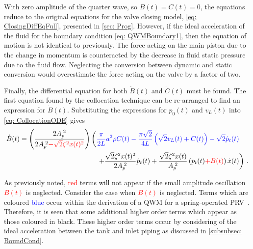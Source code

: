 With zero amplitude of the quarter wave, so $B(t) = C(t) = 0$, the equations reduce to the original equations for the valve closing model, \cref{eq: ClosingDiffEqFull}, presented in \cref{sec: Prog}. However, if the ideal acceleration of the fluid for the boundary condition \cref{eq: QWMBoundary1}, then the equation of motion is not identical to previously. The force acting on the main piston due to the change in momentum is counteracted by the decrease in fluid static pressure due to the fluid flow. Neglecting the conversion between dynamic and static conversion would overestimate the force acting on the valve by a factor of two.
%

Finally, the differential equation for both $\dot{B}(t)$ and $\dot{C}(t)$ must be found. The first equation found by the collocation technique can be re-arranged to find an expression for $\dot{B}(t)$. Substituting the expressions for $p_0(t)$ and $v_L(t)$ into \cref{eq: CollocationODE} gives
~
\begin{equation}  \label{eq: QWMFullDiffB}
\begin{split}
    \dot{B}(t) = \left( \frac{2 A_p\power{2}}{2 A_p\power{2} \textcolor{Red}{- \sqrt{2} \zeta^2 x(t)^2}} \right)
    &\left( \textcolor{Blue}{
    \frac{\pi}{2L} a^2 \rho C(t) - \frac{\pi \sqrt{2}}{4L} \left( \sqrt{2} v_L(t) + C(t) \right) - \sqrt{2} \dot{p}_t(t)}
     \right.  \\ & \quad \left.  %
    + \frac{\sqrt{2} \zeta^2 x(t)^2}{2 A_p\power{2}} \dot{p}_t(t) + \frac{\sqrt{2} \zeta^2 x(t)}{A_p\power{2}} \left( p_t(t) \textcolor{Red}{+ B(t)} \right) \dot{x}(t)
    \right) \, .
\end{split}
\end{equation}

As previously noted, \textcolor{Red}{red} terms will not appear if the small amplitude oscillation \textcolor{Red}{$B(t)$} is neglected. Consider the case when \textcolor{Red}{$B(t)$} is neglected. Terms which are coloured \textcolor{Blue}{blue} occur within the derivation of a QWM for a spring-operated PRV~\cite{Hos2015ModelPipe}. Therefore, it is seen that some additional higher order terms which appear as those coloured in black. These higher order terms occur by considering of the ideal acceleration between the tank and inlet piping as discussed in \cref{subsubsec: BoundCond}.

